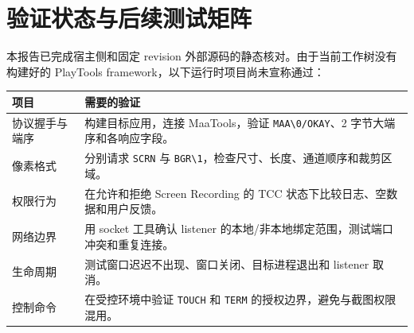 \documentclass[UTF8,a4paper,11pt]{ctexart}
\begin{document}
\section{验证状态与后续测试矩阵}

本报告已完成宿主侧和固定 revision 外部源码的静态核对。由于当前工作树没有构建好的 PlayTools framework，以下运行时项目尚未宣称通过：

\begin{center}
\begin{tabularx}{\textwidth}{>{\raggedright\arraybackslash}p{} X}
\toprule
项目 & 需要的验证 \\
\midrule
协议握手与端序 & 构建目标应用，连接 MaaTools，验证 \texttt{MAA\textbackslash{}0/OKAY}、2 字节大端序和各响应字段。\\
像素格式 & 分别请求 \texttt{SCRN} 与 \texttt{BGR\textbackslash{}1}，检查尺寸、长度、通道顺序和裁剪区域。\\
权限行为 & 在允许和拒绝 Screen Recording 的 TCC 状态下比较日志、空数据和用户反馈。\\
网络边界 & 用 socket 工具确认 listener 的本地/非本地绑定范围，测试端口冲突和重复连接。\\
生命周期 & 测试窗口迟迟不出现、窗口关闭、目标进程退出和 listener 取消。\\
控制命令 & 在受控环境中验证 \texttt{TOUCH} 和 \texttt{TERM} 的授权边界，避免与截图权限混用。\\
\bottomrule
\end{tabularx}
\end{center}
\end{document}
